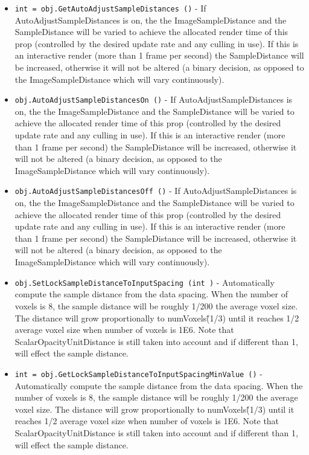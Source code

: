 \begin{itemize}
\item  \verb|int = obj.GetAutoAdjustSampleDistances ()| -  If AutoAdjustSampleDistances is on, the the ImageSampleDistance
 and the SampleDistance will be varied to achieve the allocated 
 render time of this prop (controlled by the desired update rate 
 and any culling in use). If this is an interactive render (more 
 than 1 frame per second) the SampleDistance will be increased, 
 otherwise it will not be altered (a binary decision, as opposed
 to the ImageSampleDistance which will vary continuously).

\item  \verb|obj.AutoAdjustSampleDistancesOn ()| -  If AutoAdjustSampleDistances is on, the the ImageSampleDistance
 and the SampleDistance will be varied to achieve the allocated 
 render time of this prop (controlled by the desired update rate 
 and any culling in use). If this is an interactive render (more 
 than 1 frame per second) the SampleDistance will be increased, 
 otherwise it will not be altered (a binary decision, as opposed
 to the ImageSampleDistance which will vary continuously).

\item  \verb|obj.AutoAdjustSampleDistancesOff ()| -  If AutoAdjustSampleDistances is on, the the ImageSampleDistance
 and the SampleDistance will be varied to achieve the allocated 
 render time of this prop (controlled by the desired update rate 
 and any culling in use). If this is an interactive render (more 
 than 1 frame per second) the SampleDistance will be increased, 
 otherwise it will not be altered (a binary decision, as opposed
 to the ImageSampleDistance which will vary continuously).

\item  \verb|obj.SetLockSampleDistanceToInputSpacing (int )| -  Automatically compute the sample distance from the data spacing.  When
 the number of voxels is 8, the sample distance will be roughly 1/200
 the average voxel size. The distance will grow proportionally to
 numVoxels\^(1/3) until it reaches 1/2 average voxel size when number of
 voxels is 1E6. Note that ScalarOpacityUnitDistance is still taken into
 account and if different than 1, will effect the sample distance.

\item  \verb|int = obj.GetLockSampleDistanceToInputSpacingMinValue ()| -  Automatically compute the sample distance from the data spacing.  When
 the number of voxels is 8, the sample distance will be roughly 1/200
 the average voxel size. The distance will grow proportionally to
 numVoxels\^(1/3) until it reaches 1/2 average voxel size when number of
 voxels is 1E6. Note that ScalarOpacityUnitDistance is still taken into
 account and if different than 1, will effect the sample distance.


\end{itemize}

